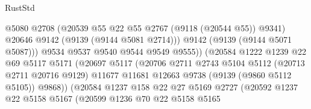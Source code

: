 \begin{lexlean}{RustStd}
\begin{coremodule}
                                            @5080
                                            @2708
                                            (@20539 @55 @22 @55 @2767 (@9118 (@20544 @55)) @9341)
                                            @20646
                                            @9142
                                            (@9139 (@9144 @5081 @2714)))
                                          @9142
                                          (@9139 (@9144 @5071 @5087)))
                                        @9534
                                        @9537
                                        @9540
                                        @9544
                                        @9549
                                        @9555))
                                    (@20584
                                      @1222
                                      @1239
                                      @22
                                      @69
                                      @5117
                                      @5171
                                      (@20697
                                        @5117
                                        (@20706
                                          @2711
                                          @2743
                                          @5104
                                          @5112
                                          (@20713 @2711 @20716 @9129)
                                          @11677
                                          @11681
                                          @12663
                                          @9738
                                          (@9139 (@9860 @5112 @5105))
                                          @9868))
                                      (@20584
                                        @1237
                                        @158
                                        @22
                                        @27
                                        @5169
                                        @2727
                                        (@20592
                                          @1237
                                          @22
                                          @5158
                                          @5167
                                          (@20599
                                            @1236
                                            @70
                                            @22
                                            @5158
                                            @5165

\end{coremodule}
\end{lexlean}
